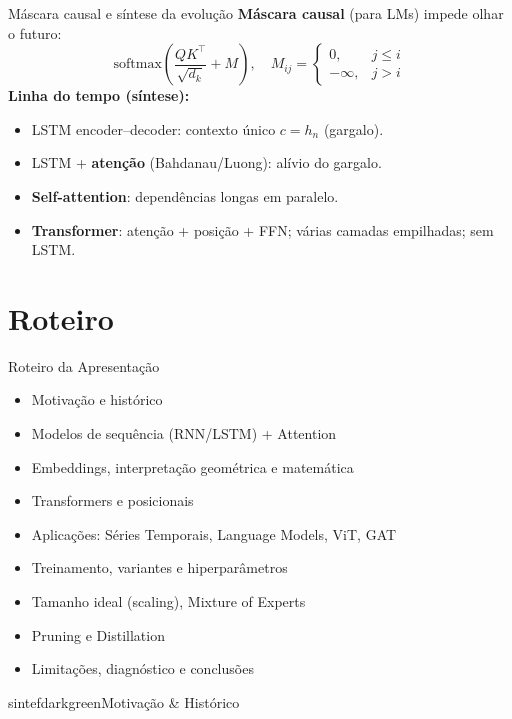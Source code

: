 \documentclass{beamer}
\begin{document}
\begin{frame}{Máscara causal e síntese da evolução}
	\textbf{Máscara causal} (para LMs) impede olhar o futuro:
	\[
		\mathrm{softmax}\!\left(\frac{QK^\top}{\sqrt{d_k}}+M\right),
		\quad
		M_{ij}=\begin{cases}
			0,       & j\le i \\
			-\infty, & j>i
		\end{cases}
	\]
	\textbf{Linha do tempo (síntese):}
	\begin{itemize}
		\item LSTM encoder--decoder: contexto único $c=h_n$ (gargalo).
		\item LSTM + \textbf{atenção} (Bahdanau/Luong): alívio do gargalo.
		\item \textbf{Self-attention}: dependências longas em paralelo.
		\item \textbf{Transformer}: atenção + posição + FFN; várias camadas empilhadas; sem LSTM.
	\end{itemize}
\end{frame}

\section{Roteiro}
\begin{frame}{Roteiro da Apresentação}
	\begin{itemize}[<+->]
		\item Motivação e histórico
		\item Modelos de sequência (RNN/LSTM) + Attention
		\item Embeddings, interpretação geométrica e matemática
		\item Transformers e posicionais
		\item Aplicações: Séries Temporais, Language Models, ViT, GAT
		\item Treinamento, variantes e hiperparâmetros
		\item Tamanho ideal (scaling), Mixture of Experts
		\item Pruning e Distillation
		\item Limitações, diagnóstico e conclusões
	\end{itemize}
\end{frame}

\begin{chapter}{sintefdarkgreen}{Motivação \& Histórico}\end{chapter}
\end{document}
